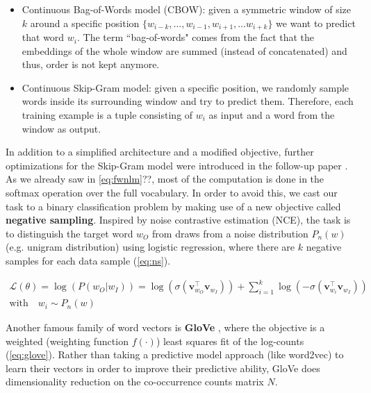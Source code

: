 \begin{itemize}
	\item Continuous Bag-of-Words model (CBOW): given a symmetric window of size $k$ around a specific position $\{w_{i-k}, \ldots , w_{i-1}, w_{i+1}, \ldots w_{i+k}\}$ we want to predict that word $w_i$. The term ``bag-of-words" comes from the fact that the embeddings of the whole window are summed (instead of concatenated) and thus, order is not kept anymore.
	
	\item Continuous Skip-Gram model: given a specific position, we randomly sample words inside its surrounding window and try to predict them. Therefore, each training example is a tuple consisting of $w_i$ as input and a word from the window as output.
\end{itemize}

In addition to a simplified architecture and a modified objective, further optimizations for the Skip-Gram model were introduced in the follow-up paper \cite{mikolov2013distributed}. As we already saw in \autoref{eq:fwnlm}??, most of the computation is done in the softmax operation over the full vocabulary. In order to avoid this, we cast our task to a binary classification problem by making use of a new objective called \textbf{negative sampling}. Inspired by noise contrastive estimation (NCE), the task is to distinguish the target word $w_O$ from draws from a noise distribution $P_n(w)$ (e.g. unigram distribution) using logistic regression, where there are $k$ negative samples for each data sample (\autoref{eq:ns}).

\begin{equation} \label{eq:ns}
	\begin{gathered}
		\mathcal{L}(\theta) = \log(P(w_O|w_I))=\log(\sigma(\mathbf{v}_{w_O}^{\top} \mathbf{v}_{w_I})) + \sum_{i=1}^{k} \log(-\sigma(\mathbf{v}_{w_i}^{\top} \mathbf{v}_{w_I})) \\ 
		\text{with} \quad w_i \sim P_n(w)
	\end{gathered}
\end{equation}

Another famous family of word vectors is \textbf{GloVe} \cite{pennington2014glove}, where the objective is a weighted (weighting function $f(\cdot)$) least squares fit of the log-counts (\autoref{eq:glove}). Rather than taking a predictive model approach (like word2vec) to learn their vectors in order to improve their predictive ability, GloVe does dimensionality reduction on the co-occurrence counts matrix $N$. 

